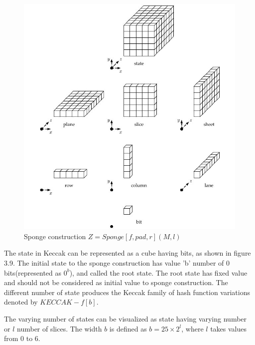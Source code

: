   \begin{figure}
    \begin{center}
      \includegraphics[width=6.5in]{keccakstateterminology.jpg}
    \end{center}
    \caption{Sponge construction $Z = Sponge[f, pad, r](M, l)$\cite{00015}}
    \label{fig:lab}
  \end{figure}

  The state in Keccak can be represented as a cube having bits, as shown in figure 3.9. The initial state to the sponge
  construction has value 'b' number of 0 bits(represented as $0^{b}$), and called the root state. The root state has fixed
  value and should not be considered as initial value to sponge construction. The different number of state produces
  the Keccak family of hash function variations denoted by $KECCAK-f[b]$.
  
  The varying number of states can be visualized as state having varying number or $l$ number of slices. The width $b$ is
  defined as $b = 25 \times 2^{l}$, where $l$ takes values from 0 to 6.
  
